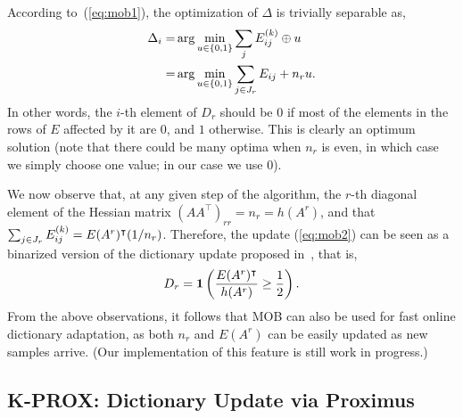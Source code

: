 \documentclass[twocolumn]{IEEEtran}
\theoremstyle{definition}
\def\transp{^\intercal}
\newcommand{\refeq}[1]{(\ref{#1})}
\begin{document}
According to~\refeq{eq:mob1}, the optimization of $\Delta$ is trivially separable as,
 \begin{eqnarray}
 \Delta_i  =& \arg\min_{u \in \{0,1\}} \sum_j E_{ij}\iter{k} \oplus u\\
 =& \arg\min_{u \in \{0,1\}} \sum_{j\in J_r} E_{ij} + n_r u.
\label{eq:mob2}
 \end{eqnarray}
In other words, the $i$-th element of $D_r$ should be $0$ if most of the elements in the rows of $E$ affected by it are $0$, and $1$ otherwise. 
This is clearly an optimum solution (note that there could be many optima  when $n_r$ is even, in which case we simply choose one value; in our case we use $0$).

We now observe that, at any given step of the algorithm, the $r$-th diagonal element of the Hessian matrix $(AA\transp)_{rr}=n_r=h(A^r)$, and that $\sum_{j\in J_r} E_{ij}\iter{k}=E(A^r)\transp(1/n_r)$. Therefore, the update \refeq{eq:mob2} can be seen as a binarized version of the dictionary update proposed in~\cite{online-dl}, that is, 
$$D_r = \indicator\left(\frac{E(A^r)\transp}{h(A^r)} \geq \frac{1}{2}\right).$$
From the above observations, it follows that MOB can also be used for fast online dictionary adaptation, as both $n_r$ and $E(A^r)$ can be easily updated as new samples arrive. (Our implementation of this feature is still work in progress.)

\subsection{K-PROX: Dictionary Update via Proximus}
\label{sec:bdl:k-prox}
\end{document}
